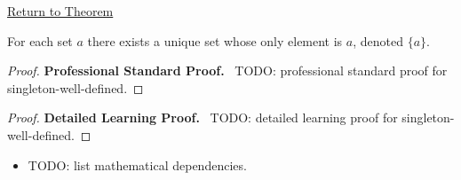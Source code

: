 \newpage
{}
\label{prf:singleton-well-defined}

\begin{remark*}[Return]
\hyperref[prop:singleton-well-defined]{Return to Theorem}
\end{remark*}

\begin{theorem*}
For each set $a$ there exists a unique set whose only element is $a$, denoted $\{a\}$.
\end{theorem*}

\begin{proof}
\textbf{Professional Standard Proof.}~
TODO: professional standard proof for singleton-well-defined.
\end{proof}

\begin{proof}
\textbf{Detailed Learning Proof.}~
TODO: detailed learning proof for singleton-well-defined.
\end{proof}

\begin{remark*}
\end{remark*}

\begin{dependencies}
\begin{itemize}
  \item TODO: list mathematical dependencies.
\end{itemize}
\end{dependencies}

\clearpage
